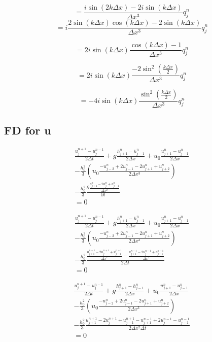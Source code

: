 \documentclass[12pt]{article}
\begin{document}
\[= \frac{i\sin\left(2k\Delta x\right) -2i\sin\left(k\Delta x\right)}{\Delta x^3}q^{n}_{j} \]
\[= i\frac{2\sin\left(k\Delta x\right)\cos\left(k\Delta x\right) -2\sin\left(k\Delta x\right)}{\Delta x^3}q^{n}_{j} \]

\[= 2i\sin\left(k\Delta x\right)\frac{\cos\left(k\Delta x\right) -1}{\Delta x^3}q^{n}_{j} \]

\[= 2i\sin\left(k\Delta x\right)\frac{-2\sin^2\left(\frac{k\Delta x}{2}\right)}{\Delta x^3}q^{n}_{j} \]

\[= -4i\sin\left(k\Delta x\right)\frac{\sin^2\left(\frac{k\Delta x}{2}\right)}{\Delta x^3}q^{n}_{j} \]
\subsection{FD for u}
\begin{multline}
 \frac{u^{n+1}_j - u^{n-1}_j}{2\Delta t} + g\frac{h^n_{j+1} -h^n_{j-1} }{2\Delta x}   + u_0\frac{u^n_{j+1} -u^n_{j-1} }{2\Delta x} \\- \frac{h_0^2}{3}\left(u_0 \frac{-u^{n}_{j-2} +2u^{n}_{j-1} -2u^{n}_{j+1} +u^{n}_{j+2}}{2\Delta x^3}  \right)  \\
 - \frac{h_0^2}{3}\frac{\partial \frac{u^{n}_{j+1} -2u^{n}_{j} +u^{n}_{j-1}}{\Delta x^2}}{\partial t} 
 \\ = 0
\end{multline}

\begin{multline}
\frac{u^{n+1}_j - u^{n-1}_j}{2\Delta t} + g\frac{h^n_{j+1} -h^n_{j-1} }{2\Delta x}   + u_0\frac{u^n_{j+1} -u^n_{j-1} }{2\Delta x} \\- \frac{h_0^2}{3}\left(u_0 \frac{-u^{n}_{j-2} +2u^{n}_{j-1} -2u^{n}_{j+1} +u^{n}_{j+2}}{2\Delta x^3}  \right)  \\
- \frac{h_0^2}{3}\frac{\frac{u^{n+1}_{j+1} -2u^{n+1}_{j} +u^{n+1}_{j-1}}{\Delta x^2} - \frac{u^{n-1}_{j+1} -2u^{n-1}_{j} +u^{n-1}_{j-1}}{\Delta x^2}}{2\Delta t} 
\\ = 0
\end{multline}

\begin{multline}
\frac{u^{n+1}_j - u^{n-1}_j}{2\Delta t} + g\frac{h^n_{j+1} -h^n_{j-1} }{2\Delta x}   + u_0\frac{u^n_{j+1} -u^n_{j-1} }{2\Delta x} \\- \frac{h_0^2}{3}\left(u_0 \frac{-u^{n}_{j-2} +2u^{n}_{j-1} -2u^{n}_{j+1} +u^{n}_{j+2}}{2\Delta x^3}  \right)  \\
- \frac{h_0^2}{3}\frac{u^{n+1}_{j+1} -2u^{n+1}_{j} +u^{n+1}_{j-1} - u^{n-1}_{j+1} +2u^{n-1}_{j} -u^{n-1}_{j-1}}{2\Delta x^2\Delta t} 
\\ = 0
\end{multline}
\end{document}

